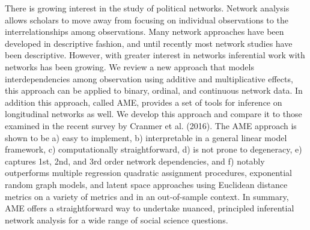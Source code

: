 There is growing interest in the study of political networks. Network analysis allows scholars to move away from focusing on individual observations to the interrelationships among observations. Many network approaches have been developed in descriptive fashion, and until recently most network studies have been descriptive. However, with greater interest in networks inferential work with networks has been growing. We review a new approach that models interdependencies among observation using additive and multiplicative effects, this approach can be applied to binary, ordinal, and continuous network data. In addition this approach, called AME, provides a set of tools for inference on longitudinal networks as well. We develop this approach and compare it to those examined in the recent survey by Cranmer et al. (2016).  The AME approach is shown to be a) easy to implement, b) interpretable in a general linear model framework, c) computationally straightforward, d) is not prone to degeneracy, e) captures 1st, 2nd, and 3rd order network dependencies, and f) notably outperforms multiple regression quadratic assignment procedures, exponential random graph models, and latent space approaches using Euclidean distance metrics on a variety of metrics and in an out-of-sample context. In summary, AME offers a straightforward way to undertake nuanced, principled inferential network analysis for a wide range of social science questions. 

